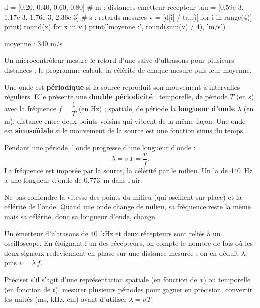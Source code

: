 \begin{python}
d = [0.20, 0.40, 0.60, 0.80]                 # m : distances emetteur-recepteur
tau = [0.59e-3, 1.17e-3, 1.76e-3, 2.36e-3]   # s : retards mesures
v = [d[i] / tau[i] for i in range(4)]
print([round(x) for x in v])
print('moyenne :', round(sum(v) / 4), 'm/s')
\end{python}
\begin{console}
[339, 342, 341, 339]
moyenne : 340 m/s
\end{console}
\noindent{} Un microcontrôleur mesure le retard d'une salve d'ultrasons pour plusieurs distances ; le programme calcule la
célérité de chaque mesure puis leur moyenne.
\begin{definition}
Une onde est \textbf{périodique} si la source reproduit son mouvement à intervalles réguliers. Elle présente une \textbf{double
périodicité} : temporelle, de période $T$ (en s), avec la fréquence $f=\dfrac{1}{T}$ (en Hz) ; spatiale, de période la \textbf{longueur d'onde} $\lambda$
(en m), distance entre deux points voisins qui vibrent de la même façon. Une onde est \textbf{sinusoïdale} si le mouvement de la
source est une fonction sinus du temps.
\end{definition}
\begin{loi}
Pendant une période, l'onde progresse d'une longueur d'onde :
\[\lambda=v\,T=\frac{v}{f}.\]
La fréquence est imposée par la source, la célérité par le milieu. Un la de \qty{440}{Hz} a une longueur d'onde de \qty{0,773}{m} dans l'air.
\end{loi}
\par{}
\begin{attention}
Ne pas confondre la vitesse des points du milieu (qui oscillent sur place) et la célérité de l'onde. Quand une onde change de milieu,
sa fréquence reste la même mais sa célérité, donc sa longueur d'onde, change.
\end{attention}
\begin{experience}
Un émetteur d'ultrasons de \qty{40}{kHz} et deux récepteurs sont reliés à un oscilloscope. En éloignant l'un des récepteurs, on compte le
nombre de fois où les deux signaux redeviennent en phase sur une distance mesurée : on en déduit $\lambda$, puis $v=\lambda\,f$.
\end{experience}
\begin{rediger}
Préciser s'il s'agit d'une représentation spatiale (en fonction de $x$) ou temporelle (en fonction de $t$), mesurer plusieurs périodes
pour gagner en précision, convertir les unités (ms, kHz, cm) avant d'utiliser $\lambda=v\,T$.
\end{rediger}
\exercices

